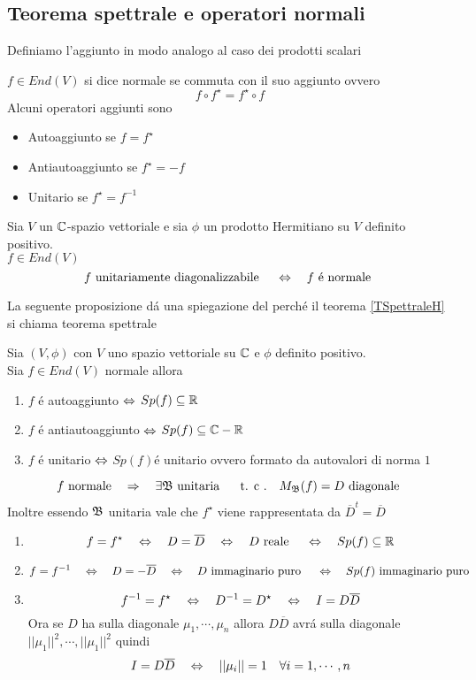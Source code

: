 \subsection{Teorema spettrale e operatori normali}
Definiamo l'aggiunto in modo analogo al caso dei prodotti scalari
\begin{defn}\bianco
$f \in End(V) $ si dice normale se commuta con il suo aggiunto ovvero
$$ f \circ f^\star = f^\star \circ f $$
Alcuni operatori aggiunti sono
\begin{itemize}
\item Autoaggiunto se $f=f^\star$
\item Antiautoaggiunto se $f^\star = -f$
\item Unitario se $f^\star=f^{-1}$
\end{itemize}
\end{defn}
\spazio
\begin{thm}\label{TSpettraleH}\bianco
Sia $V$ un $\mathbb{C}$-spazio vettoriale e sia $\phi$ un prodotto Hermitiano su $V$ definito positivo.\\
$f \in End(V)$
$$ f \text{ unitariamente diagonalizzabile } \quad \Leftrightarrow \quad f \text{ \'e normale } $$
\end{thm}
\spazio
La seguente proposizione d\'a una spiegazione del perch\'e il teorema \ref{TSpettraleH} si chiama teorema spettrale
\begin{prop}Sia $(V, \phi) $ con $V$ uno spazio vettoriale su $\mathbb{C}$ e $\phi $ definito positivo.\\
Sia $f \in End(V)$ normale allora
\begin{enumerate}
\item $f$ \'e autoaggiunto $\Leftrightarrow$ $Sp(f) \subseteq \mathbb{R}$
\item $f$ \'e antiautoaggiunto $\Leftrightarrow$ $Sp(f) \subseteq \mathbb{C} - \mathbb{R}$
\item $f$ \'e unitario $\Leftrightarrow$ $Sp(f) $\'e unitario ovvero formato da autovalori di norma $1$

\end{enumerate}
\proof $$f \text{ normale} \quad \Rightarrow \quad \exists \mathfrak{B} \text{ unitaria } \quad \text{ t. c .} \quad M_{\mathfrak{B}}(f)=D \text{ diagonale }$$
Inoltre essendo $\mathfrak{B}$ unitaria vale che 
$f^\star$ viene rappresentata da $\overline{D}^t=\overline{D}$

\begin{enumerate}
\item  
$$ f = f^\star \quad \Leftrightarrow \quad D=\overline{D} \quad \Leftrightarrow \quad D \text{ reale } \quad \Leftrightarrow \quad Sp(f)\subseteq \mathbb{R}$$
\item 
$$ f=f^{-1} \quad \Leftrightarrow  \quad D=-\overline{D} \quad \Leftrightarrow \quad D \text{ immaginario puro } \quad \Leftrightarrow \quad Sp(f) \text{ immaginario puro } $$
\item 
$$f^{-1}=f^\star \quad \Leftrightarrow \quad D^{-1}= D^\star \quad \Leftrightarrow \quad I = D \overline{D}$$
Ora se $D$ ha sulla diagonale $\mu_1, \cdots , \mu_n $ allora $D \overline{D}$ avr\'a sulla diagonale $\vert \vert \mu_1 \vert \vert ^2, \cdots, \vert \vert \mu_1 \vert \vert ^2$ quindi
$$ I = D \overline{D}\quad \Leftrightarrow \quad \vert \vert \mu_i\vert \vert = 1 \quad \forall i=1,\cdots, n $$
\end{enumerate}
\endproof
\end{prop}
%